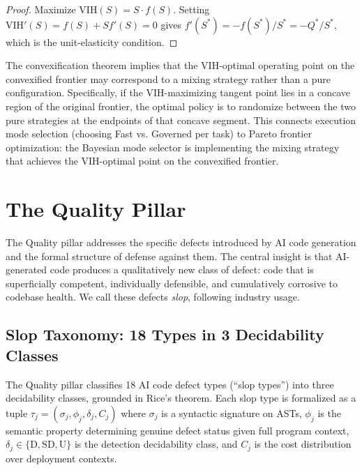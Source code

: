\documentclass[11pt, a4paper]{googledeepmind}
\begin{document}
\begin{proof}
Maximize $\text{VIH}(S) = S \cdot f(S)$. Setting $\text{VIH}'(S) = f(S) + S f'(S) = 0$ gives $f'(S^*) = -f(S^*)/S^* = -Q^*/S^*$, which is the unit-elasticity condition.
\end{proof}

The convexification theorem implies that the VIH-optimal operating point on the convexified frontier may correspond to a mixing strategy rather than a pure configuration. Specifically, if the VIH-maximizing tangent point lies in a concave region of the original frontier, the optimal policy is to randomize between the two pure strategies at the endpoints of that concave segment. This connects execution mode selection (choosing Fast vs. Governed per task) to Pareto frontier optimization: the Bayesian mode selector is implementing the mixing strategy that achieves the VIH-optimal point on the convexified frontier.
\section{The Quality Pillar}
\label{sec:quality}

The Quality pillar addresses the specific defects introduced by AI code generation and the formal structure of defense against them. The central insight is that AI-generated code produces a qualitatively new class of defect: code that is superficially competent, individually defensible, and cumulatively corrosive to codebase health. We call these defects \emph{slop}, following industry usage.

\subsection{Slop Taxonomy: 18 Types in 3 Decidability Classes}

The Quality pillar classifies 18 AI code defect types (``slop types'') into three decidability classes, grounded in Rice's theorem. Each slop type is formalized as a tuple $\tau_j = (\sigma_j, \phi_j, \delta_j, C_j)$ where $\sigma_j$ is a syntactic signature on ASTs, $\phi_j$ is the semantic property determining genuine defect status given full program context, $\delta_j \in \{\mathrm{D}, \mathrm{SD}, \mathrm{U}\}$ is the detection decidability class, and $C_j$ is the cost distribution over deployment contexts.
\end{document}
